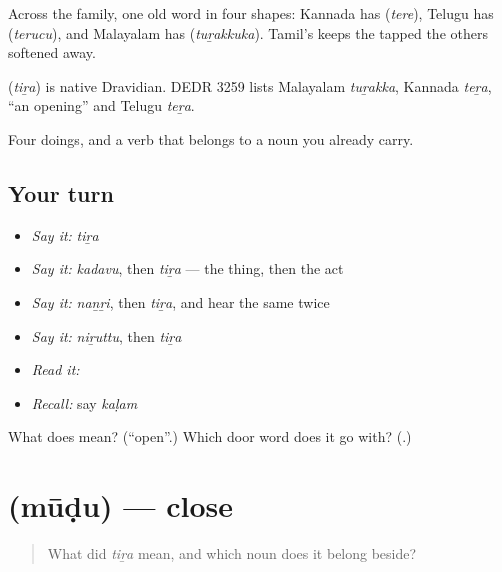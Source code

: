 Across the family, one old word in four shapes: Kannada has  (\emph{tere}), Telugu has  (\emph{terucu}), and Malayalam has  (\emph{tuṟakkuka}). Tamil's keeps the tapped \textbf{} the others softened away.

\begin{cousinweb}
\textbf{} (\emph{tiṟa}) is native Dravidian. DEDR 3259 lists Malayalam \emph{tuṟakka}, Kannada \emph{teṟa}, \textquotedblleft{}an opening\textquotedblright{} and Telugu \emph{teṟa}.
\end{cousinweb}

\begin{grammarlens}[title={What you've built}]
Four doings, and a verb that belongs to a noun you already carry.
\end{grammarlens}

\subsection*{Your turn}
\begin{itemize}
\raggedright
  \item \emph{Say it:} \emph{tiṟa}
  \item \emph{Say it:} \emph{kadavu}, then \emph{tiṟa} — the thing, then the act
  \item \emph{Say it:} \emph{naṉṟi}, then \emph{tiṟa}, and hear the same \textbf{} twice
  \item \emph{Say it:} \emph{niṟuttu}, then \emph{tiṟa}
  \item \emph{Read it:} \textbf{}
  \item \emph{Recall:} say \emph{kaḷam}
\end{itemize}

\begin{tcolorbox}[breakable,colback=teal!4,colframe=teal!35!black,title={Before you move on}]
What does  mean? (\textquotedblleft{}open\textquotedblright{}.) Which door word does it go with? (\textbf{}.)
\end{tcolorbox}
\section[\texorpdfstring{\ta{மூடு} (mūḍu)}{மூடு (mūḍu)}]{ (mūḍu) — close}

\label{lesson:TA-C65-close}



\begin{quote}
What did \emph{tiṟa} mean, and which noun does it belong beside?
\end{quote}

